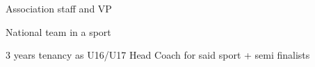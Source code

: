 


\begin{cventries}
	
	
	\cventry
	{} %
	{}
	{}
	{}
	{ %
		\begin{cvitems}
			\item {Association staff and VP}
			\item {National team in a sport}
			\item {3 years tenancy as U16/U17 Head Coach for said sport + semi finalists}
		\end{cvitems}
	}
	
	
	
	
\end{cventries}